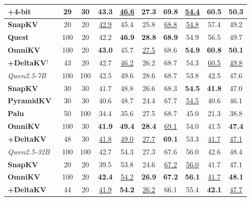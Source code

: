 \begin{table}[t]
{\begin{tabular}{lcc ccccccc}
\quad \quad \textbf{+4-bit}              & 29&30& 43.3 & \underline{46.6} & 27.3 & \textbf{69.8} & \underline{54.4} & \textbf{60.5} &\textbf{50.3}\\
\midrule
\textbf{SnapKV}~\cite{li2024snapkv}                       & 20&20& \underline{42.9} & 45.4 & 25.8 & \underline{68.8} & \underline{54.8} & 57.4 & 49.2 \\
\textbf{Quest}~\cite{tang2024quest}                       & 100&20& 42.2 & \textbf{46.9} & \textbf{28.8} & \textbf{68.9} & 54.9 & 56.5 & 49.7 \\
\textbf{OmniKV}~\cite{hao2025omnikv}                      & 100&20& \textbf{43.0} & 45.7 & \underline{27.5} & 68.6 & \textbf{54.9} & \textbf{60.8} & \textbf{50.1} \\
\quad \textbf{+DeltaKV}$^\dagger$  & 43 & 20 & 42.7 & \underline{46.2} & 26.2 & 68.7 & 54.3 & \underline{60.5} & \underline{49.8}\\
\midrule
\rowcolor[HTML]{D9EAD3} 
\textit{Qwen2.5-7B}~\cite{yang2025qwen2_1m}         & 100&100& 42.5 & 49.6 & 28.6 & 68.7 & 53.8 & 42.5 & 47.6 \\
\textbf{SnapKV}~\cite{li2024snapkv}                      & 30&30& 41.7 & 48.8 & 26.6 & 68.3 & \textbf{54.5} & \textbf{41.8} & 47.0 \\
\textbf{PyramidKV}~\cite{cai2024pyramidkv}                   & 30&30& 40.6 & 48.7 & 24.4 & 67.7 & \underline{54.5} & 40.6 & 46.1 \\
\textbf{Palu}~\cite{chang2025palu}                      & 50&100& 34.4 & 35.6 & 27.5 & 68.7 & 45.0 & 21.3 & 38.8 \\
\textbf{OmniKV}~\cite{hao2025omnikv}                      & 100&30& \textbf{41.9} & \textbf{49.4} & \textbf{28.4} & \underline{69.1} & 54.0 & 41.5 & \textbf{47.4} \\
\quad \textbf{+DeltaKV}            & 48&30& \underline{41.8} & \underline{49.0} & \underline{27.7} & \textbf{69.1} & 53.3 & \underline{41.7} & \underline{47.1} \\
\midrule
\rowcolor[HTML]{FFF2CC}
\textit{Qwen2.5-32B}~\cite{team2024qwen2}        & 100&100& 42.7 & 54.3 & 27.3 & 67.6 & 56.0 & 42.6 & 48.4 \\
\textbf{SnapKV}~\cite{li2024snapkv}                      & 20&20& 39.5& 53.8& 24.6& \underline{67.2}& \underline{56.0}& 41.7& 47.1\\
\textbf{OmniKV}~\cite{hao2025omnikv} &  100&20& \textbf{42.4}& \underline{54.2}& \textbf{26.9}& \textbf{67.2}& \textbf{56.1}& \underline{41.7}& \textbf{48.1}\\
\quad \textbf{+DeltaKV}& 44&20& \underline{41.9} & \textbf{54.2}& \underline{26.2} & 66.1& 55.4& \textbf{42.1}& \underline{47.7}\\
\bottomrule
\end{tabular}
}
\end{table}
\setlength{\textfloatsep}{1.5em}



